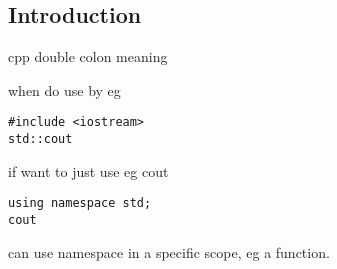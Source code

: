 
\subsection{Introduction}


cpp double colon meaning

when do
use by eg

\begin{verbatim}
#include <iostream>
std::cout
\end{verbatim}

if want to just use eg cout
\begin{verbatim}
using namespace std;
cout
\end{verbatim}


can use namespace in a specific scope, eg a function.
